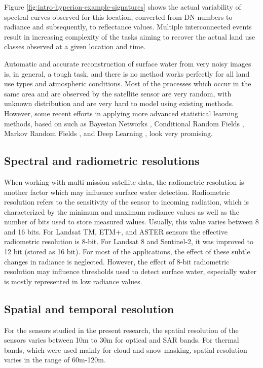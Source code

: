 Figure \ref{fig:intro-hyperion-example-signatures} shows the actual variability of spectral curves observed for this location, converted from DN numbers to radiance and subsequently, to reflectance values. Multiple interconnected events result in increasing complexity of the tasks aiming to recover the actual land use classes observed at a given location and time.

Automatic and accurate reconstruction of surface water from very noisy images is, in general, a tough task, and there is no method works perfectly for all land use types and atmospheric conditions. Most of the processes which occur in the same area and are observed by the satellite sensor are very random, with unknown distribution and are very hard to model using existing methods. However, some recent efforts in applying more advanced statistical learning methods, based on such as Bayesian Networks \citep{mello2013bayesian}, Conditional Random Fields \citep{hoberg2015conditional}, Markov Random Fields \citep{elmi2016dynamic}, and Deep Learning \citep{chen2014deep}, look very promising.

\subsection{Spectral and radiometric resolutions}

When working with multi-mission satellite data, the radiometric resolution is another factor which may influence surface water detection.  Radiometric resolution refers to the sensitivity of the sensor to incoming radiation, which is characterized by the minimum and maximum radiance values as well as the number of bits used to store measured values. Usually, this value varies between 8 and 16 bits. For Landsat TM, ETM+, and ASTER sensors the effective radiometric resolution is 8-bit. For Landsat 8 and Sentinel-2, it was improved to 12 bit (stored as 16 bit). For most of the applications, the effect of these subtle changes in radiance is neglected. However, the effect of 8-bit radiometric resolution may influence thresholds used to detect surface water, especially water is mostly represented in low radiance values.

\subsection{Spatial and temporal resolution}
For the sensors studied in the present research, the spatial resolution of the sensors varies between 10m to 30m for optical and SAR bands. For thermal bands, which were used mainly for cloud and snow masking, spatial resolution varies in the range of 60m-120m. 


